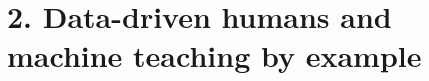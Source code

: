 \documentclass[justified]{tufte-handout}
\begin{document}
\section{2. Data-driven humans and machine teaching by example}



\end{document}
